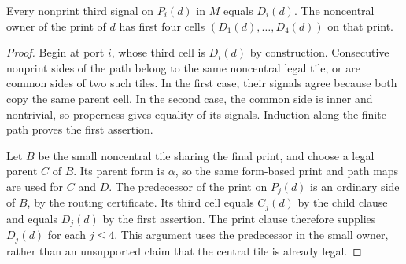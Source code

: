 \begin{lemma}
\label{lem:comp/signals}
Every nonprint third signal on $P_i(d)$ in $M$ equals $D_i(d)$.
The noncentral owner of the print of $d$ has first four cells
$(D_1(d),\ldots,D_4(d))$ on that print.
\end{lemma}
\begin{proof}
Begin at port $i$, whose third cell is $D_i(d)$ by construction.
Consecutive nonprint sides of the path belong to the same noncentral legal
tile, or are common sides of two such tiles. In the first case, their
signals agree because both copy the same parent cell. In the second case,
the common side is inner and nontrivial, so properness gives equality of
its signals. Induction along the finite path proves the first assertion.

Let $B$ be the small noncentral tile sharing the final print, and choose a
legal parent $C$ of $B$. Its parent form is $\alpha$, so the same form-based
print and path maps are used for $C$ and $D$. The predecessor of the print
on $P_j(d)$ is an ordinary side of $B$, by the routing certificate. Its
third cell equals $C_j(d)$ by the child clause and equals $D_j(d)$ by the
first assertion. The print clause therefore supplies $D_j(d)$ for each
$j\le4$. This argument uses the predecessor in the small owner, rather
than an unsupported claim that the central tile is already legal.
\end{proof}

